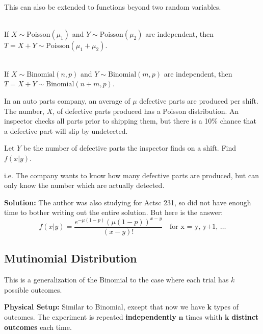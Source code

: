 This can also be extended to functions beyond two random variables. \\

\begin{theorem}
    \phantom{}\\
    If $X \sim \text{Poisson}(\mu_1)$ and $Y \sim \text{Poisson}(\mu_2)$ are independent, then 
    $T = X + Y \sim \text{Poisson}(\mu_1 + \mu_2)$.
\end{theorem}


\begin{theorem}
    \phantom{}\\
    If $X \sim \text{Binomial}(n, p)$ and $Y \sim \text{Binomial}(m, p)$ are independent, then \\
    $T = X + Y \sim \text{Binomial}(n + m, p)$.
\end{theorem}
\phantom{}

\begin{example}
    In an auto parts company, an average of $\mu$ defective parts are produced per shift. The number, $X$, of defective parts produced has a Poisson distribution.
    An inspector checks all parts prior to shipping them, but there is a 10\% chance that a defective part will slip by undetected.

    Let $Y$ be the number of defective parts the inspector finds on a shift. Find $f(x|y)$.

    i.e. The company wants to know how many defective parts are produced, but can only know the number which are actually detected.

    \textbf{Solution:} The author was also studying for Actsc 231, so did not have enough time to bother writing out the entire solution. But here is the answer:
    \[
        f(x|y) = \frac{e^{-\mu (1-p)} (\mu (1-p))^{x-y}}{(x-y)!} \quad \text{for x = y, y+1, \ldots}
    \]
\end{example}

\pagebreak

\subsection{Mutinomial Distribution}

This is a generalization of the Binomial to the case where each trial has $k$ possible outcomes.

\textbf{Physical Setup:} Similar to Binomial, except that now we have $\mathbf{k}$ types of outcomes. The experiment is repeated \textbf{independently} $\mathbf{n}$ times whith $\mathbf{k}$ \textbf{distinct outcomes} each time.

